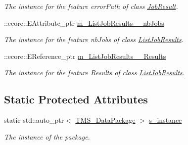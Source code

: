 \begin{DoxyCompactItemize}
\begin{DoxyCompactList}\small\item\em The instance for the feature errorPath of class \hyperlink{classTMS__Data_1_1JobResult}{JobResult}. \item\end{DoxyCompactList}\item 
\hypertarget{classTMS__Data_1_1TMS__DataPackage_ac7d160c48fd0ec66f0497595349a4593}{
::ecore::EAttribute\_\-ptr \hyperlink{classTMS__Data_1_1TMS__DataPackage_ac7d160c48fd0ec66f0497595349a4593}{m\_\-ListJobResults\_\-\_\-nbJobs}}
\label{classTMS__Data_1_1TMS__DataPackage_ac7d160c48fd0ec66f0497595349a4593}

\begin{DoxyCompactList}\small\item\em The instance for the feature nbJobs of class \hyperlink{classTMS__Data_1_1ListJobResults}{ListJobResults}. \item\end{DoxyCompactList}\item 
\hypertarget{classTMS__Data_1_1TMS__DataPackage_aedbce4187e6ecc615ef1d97e2091e06a}{
::ecore::EReference\_\-ptr \hyperlink{classTMS__Data_1_1TMS__DataPackage_aedbce4187e6ecc615ef1d97e2091e06a}{m\_\-ListJobResults\_\-\_\-Results}}
\label{classTMS__Data_1_1TMS__DataPackage_aedbce4187e6ecc615ef1d97e2091e06a}

\begin{DoxyCompactList}\small\item\em The instance for the feature Results of class \hyperlink{classTMS__Data_1_1ListJobResults}{ListJobResults}. \item\end{DoxyCompactList}\end{DoxyCompactItemize}
\subsection*{Static Protected Attributes}
\begin{DoxyCompactItemize}
\item 
\hypertarget{classTMS__Data_1_1TMS__DataPackage_ae29cdb6ba80f9a569d98dbfc2c8fbcce}{
static std::auto\_\-ptr$<$ \hyperlink{classTMS__Data_1_1TMS__DataPackage}{TMS\_\-DataPackage} $>$ \hyperlink{classTMS__Data_1_1TMS__DataPackage_ae29cdb6ba80f9a569d98dbfc2c8fbcce}{s\_\-instance}}
\label{classTMS__Data_1_1TMS__DataPackage_ae29cdb6ba80f9a569d98dbfc2c8fbcce}

\begin{DoxyCompactList}\small\item\em The instance of the package. \item\end{DoxyCompactList}\end{DoxyCompactItemize}


